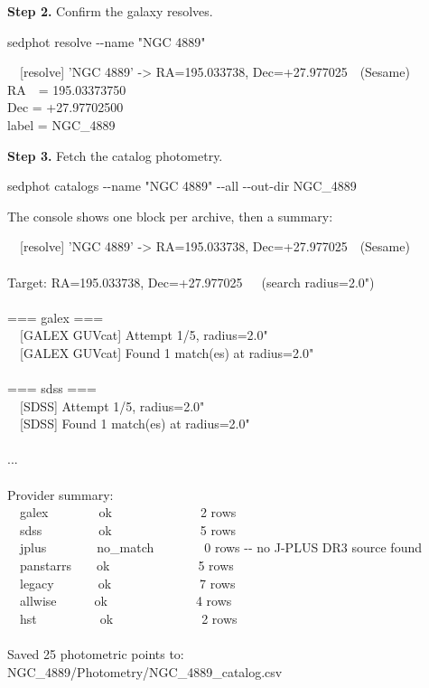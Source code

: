 \documentclass[11pt]{article}
\newcommand{\cmdline}[1]{\begin{cmd}\ttfamily #1\end{cmd}}
\begin{document}
\textbf{Step 2.} Confirm the galaxy resolves.

\cmdline{sedphot resolve -{}-name "NGC 4889"}

\begin{cmd}\ttfamily\frenchspacing
\mbox{}~~[resolve] 'NGC 4889' -> RA=195.033738, Dec=+27.977025~~(Sesame)\\
RA~~= 195.03373750\\
Dec = +27.97702500\\
label = NGC\_4889
\end{cmd}

\textbf{Step 3.} Fetch the catalog photometry.

\cmdline{sedphot catalogs -{}-name "NGC 4889" -{}-all -{}-out-dir NGC\_4889}

The console shows one block per archive, then a summary:

\begin{cmd}\ttfamily\frenchspacing
\mbox{}~~[resolve] 'NGC 4889' -> RA=195.033738, Dec=+27.977025~~(Sesame)\\
\mbox{}\\
Target: RA=195.033738, Dec=+27.977025~~~(search radius=2.0")\\
\mbox{}\\
=== galex ===\\
\mbox{}~~[GALEX GUVcat] Attempt 1/5, radius=2.0"\\
\mbox{}~~[GALEX GUVcat] Found 1 match(es) at radius=2.0"\\
\mbox{}\\
=== sdss ===\\
\mbox{}~~[SDSS] Attempt 1/5, radius=2.0"\\
\mbox{}~~[SDSS] Found 1 match(es) at radius=2.0"\\
\mbox{}\\
...\\
\mbox{}\\
Provider summary:\\
\mbox{}~~galex~~~~~~~~ok~~~~~~~~~~~~~~2 rows\\
\mbox{}~~sdss~~~~~~~~~ok~~~~~~~~~~~~~~5 rows\\
\mbox{}~~jplus~~~~~~~~no\_match~~~~~~~~0 rows -{}- no J-PLUS DR3 source found\\
\mbox{}~~panstarrs~~~~ok~~~~~~~~~~~~~~5 rows\\
\mbox{}~~legacy~~~~~~~ok~~~~~~~~~~~~~~7 rows\\
\mbox{}~~allwise~~~~~~ok~~~~~~~~~~~~~~4 rows\\
\mbox{}~~hst~~~~~~~~~~ok~~~~~~~~~~~~~~2 rows\\
\mbox{}\\
Saved 25 photometric points to: NGC\_4889/Photometry/NGC\_4889\_catalog.csv
\end{cmd}
\end{document}
